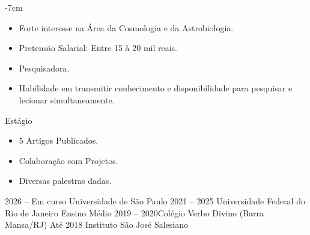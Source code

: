 \documentclass[10pt,a4paper]{altacv}
\begin{document}



\begin{adjustwidth}{}{-7cm}
\makecvheader
\end{adjustwidth}


\begin{itemize}
\item Forte interesse na Área da Cosmologia e da Astrobiologia.
\item Pretensão Salarial: Entre 15 à 20 mil reais.
\item Pesquisadora.
\item Habilidade em transmitir conhecimento e disponibilidade para pesquisar e lecionar simultaneamente.
\end{itemize}
\bigskip


{Estágio}


\begin{itemize}
\item  5 Artigos Publicados. \\     \item Colaboração com Projetos.\\
\item Diversas palestras dadas.\\
\end{itemize}
\bigskip



{2026 -- Em curso} {Universidade de São Paulo}
{2021 -- 2025} {Universidade Federal do Rio de Janeiro}
\cvevent{} {Ensino Médio}
{2019 -- 2020}{Colégio Verbo Divino (Barra Mansa/RJ)}
{ Até 2018 }{Instituto São José Salesiano }
\end{document}

